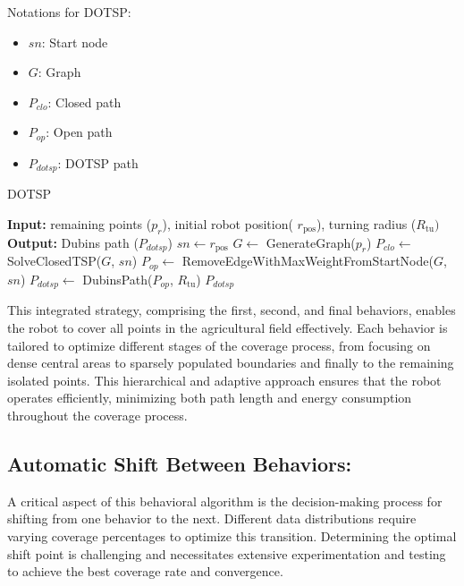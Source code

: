 Notations for DOTSP:
\begin{multicols}{2}
\begin{itemize}[noitemsep,topsep=0pt]
    \item $sn$: Start node
    \item $G$: Graph
    \item $P_{clo}$: Closed path
    \item $P_{op}$: Open path
    \item $P_{dotsp}$: DOTSP path
\end{itemize}
\end{multicols}

\begin{algorithm}[H]
    \caption{DOTSP}
    \label{alg:dotsp_path}
    \begin{algorithmic}[1]
    \Statex \textbf{Input:} remaining points ($p_r$), initial robot position( $r_{\text{pos}}$), turning radius ($R_{\text{tu}})$
    \Statex \textbf{Output:} Dubins path ($P_{dotsp}$)
    \newline
    \State $sn \leftarrow r_{\text{pos}}$
    \State $G \leftarrow$ GenerateGraph($p_r$)
    \State $P_{clo} \leftarrow$ SolveClosedTSP($G$, $sn$)
    \State $P_{op} \leftarrow$ RemoveEdgeWithMaxWeightFromStartNode($G$, $sn$)
    \State $P_{dotsp} \leftarrow$ DubinsPath($P_{op}$, $R_{\text{tu}}$)
    \State \Return $P_{dotsp}$
    \end{algorithmic}
    \end{algorithm}

This integrated strategy, comprising the first, second, and final behaviors, enables the robot to cover all points in the agricultural field effectively. Each behavior is tailored to optimize different stages of the coverage process, from focusing on dense central areas to sparsely populated boundaries and finally to the remaining isolated points. This hierarchical and adaptive approach ensures that the robot operates efficiently, minimizing both path length and energy consumption throughout the coverage process.



\subsection{Automatic Shift Between Behaviors: }
A critical aspect of this behavioral algorithm is the decision-making process for shifting from one behavior to the next. Different data distributions require varying coverage percentages to optimize this transition. Determining the optimal shift point is challenging and necessitates extensive experimentation and testing to achieve the best coverage rate and convergence.

